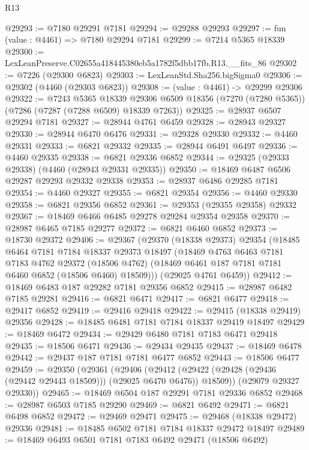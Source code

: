 \begin{lexlean}{R13}
\begin{coremodule}
@29293 := @7180 @29291 @7181
@29294 := @29288 @29293
@29297 := fun (value : @4461) => @7180 @29294 @7181
@29299 := @7214 @5365 @18339
@29300 := LexLeanPreserve.C02655a418445380eb5a1782f5dbb17fb.R13.__fits_86
@29302 := @7226 (@29300 @6823)
@29303 := LexLeanStd.Sha256.bigSigma0
@29306 := @29302 (@4460 (@29303 @6823))
@29308 := (value : @4461) -> @29299 @29306
@29322 := @7243
    @5365
    @18339
    @29306
    @6509
    @18356
    (@7270 (@7280 @5365))
    (@7286 (@7287 (@7288 @6509) @18339 @7263))
@29325 := @28937 @6507 @29294 @7181
@29327 := @28944 @4761 @6459
@29328 := @28943 @29327
@29330 := @28944 @6470 @6476
@29331 := @29328 @29330
@29332 := @4460 @29331
@29333 := @6821 @29332
@29335 := @28944 @6491 @6497
@29336 := @4460 @29335
@29338 := @6821 @29336 @6852
@29344 := @29325 (@29333 @29338) (@4460 (@28943 @29331 @29335))
@29350 := @18469 @6487 @6506 @29287 @29293 @29332 @29338
@29353 := @28937 @6486 @29285 @7181
@29354 := @4460 @29327
@29355 := @6821 @29354
@29356 := @4460 @29330
@29358 := @6821 @29356 @6852
@29361 := @29353 (@29355 @29358) @29332
@29367 := @18469 @6466 @6485 @29278 @29284 @29354 @29358
@29370 := @28987 @6465 @7185 @29277
@29372 := @6821 @6460 @6852
@29373 := @18730 @29372
@29406 := @29367
    (@29370
      (@18338 @29373)
      @29354
      (@18485
        @6464
        @7181
        @7184
        @18337
        @29373
        @18497
        (@18469
          @4763
          @6463
          @7181
          @7183
          @4762
          @29372
          (@18506 @4762)
          (@18469 @6461 @187 @7181 @7181 @6460 @6852 (@18506 @6460) @18509)))
      (@29025 @4761 @6459))
@29412 := @18469 @6483 @187 @29282 @7181 @29356 @6852
@29415 := @28987 @6482 @7185 @29281
@29416 := @6821 @6471
@29417 := @6821 @6477
@29418 := @29417 @6852
@29419 := @29416 @29418
@29422 := @29415 (@18338 @29419) @29356
@29428 := @18485 @6481 @7181 @7184 @18337 @29419 @18497
@29429 := @18469 @6472
@29434 := @29429 @6480 @7181 @7183 @6471 @29418
@29435 := @18506 @6471
@29436 := @29434 @29435
@29437 := @18469 @6478
@29442 := @29437 @187 @7181 @7181 @6477 @6852
@29443 := @18506 @6477
@29459 := @29350
    (@29361
      (@29406
        (@29412 (@29422 (@29428 (@29436 (@29442 @29443 @18509))) (@29025 @6470 @6476)) @18509))
      (@29079 @29327 @29330))
@29465 := @18469 @6504 @187 @29291 @7181 @29336 @6852
@29468 := @28987 @6503 @7185 @29290
@29469 := @6821 @6492
@29471 := @6821 @6498 @6852
@29472 := @29469 @29471
@29475 := @29468 (@18338 @29472) @29336
@29481 := @18485 @6502 @7181 @7184 @18337 @29472 @18497
@29489 := @18469 @6493 @6501 @7181 @7183 @6492 @29471 (@18506 @6492)

\end{coremodule}
\end{lexlean}
